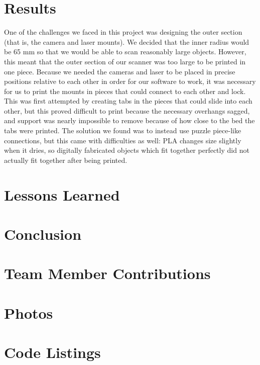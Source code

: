 \documentclass[12pt, letterpaper]{article}
\begin{document}
\section{Results}
One of the challenges we faced in this project was designing the outer section (that is,
the camera and laser mounts). We decided that the inner radius would be 65 mm so that
we would be able to scan reasonably large objects. However, this meant that the outer
section of our scanner was too large to be printed in one piece. Because we needed
the cameras and laser to be placed in precise positions relative to each other in order
for our software to work, it was necessary for us to print the mounts in pieces that
could connect to each other and lock. This was first attempted by creating tabs in
the pieces that could slide into each other, but this proved difficult to print because
the necessary overhangs sagged, and support was nearly impossible to remove because of
how close to the bed the tabs were printed. The solution we found was to instead use
puzzle piece-like connections, but this came with difficulties as well: PLA changes size
slightly when it dries, so digitally fabricated objects which fit together perfectly
did not actually fit together after being printed.

\section{Lessons Learned}

\section{Conclusion}


\section{Team Member Contributions}

\appendix
\section{Photos}

\section{Code Listings}
\end{document}
